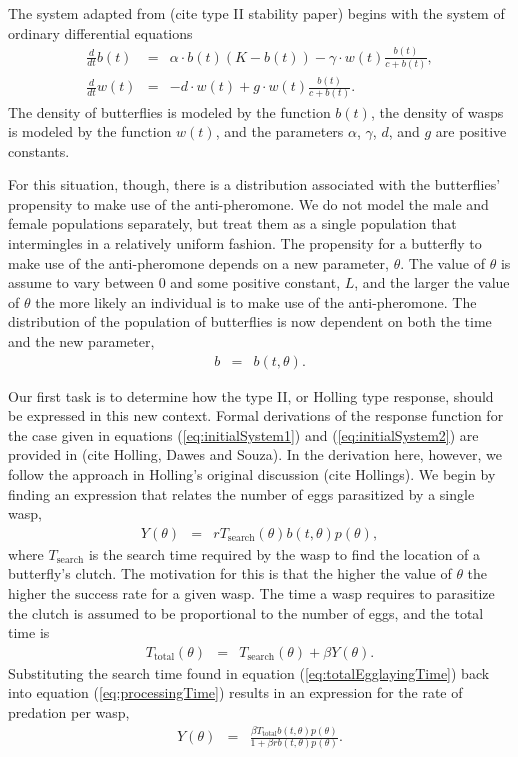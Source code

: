 \documentclass[12pt]{article}
\begin{document}
The system adapted from (cite type II stability paper) begins with the
system of ordinary differential equations
\begin{eqnarray}
  \label{eq:initialSystem1}
  \frac{d}{dt} b(t) & = & \alpha \cdot b(t) (K - b(t)) - \gamma \cdot w(t) \frac{b(t)}{c+b(t)}, \\
  \label{eq:initialSystem2}
  \frac{d}{dt} w(t) & = & -d \cdot w(t) + g \cdot w(t) \frac{b(t)}{c+b(t)}.
\end{eqnarray}
The density of butterflies is modeled by the function $b(t)$, the
density of wasps is modeled by the function $w(t)$, and the parameters
$\alpha$, $\gamma$, $d$, and $g$ are positive constants. 

For this situation, though, there is a distribution associated with
the butterflies' propensity to make use of the anti-pheromone. We do
not model the male and female populations separately, but treat them
as a single population that intermingles in a relatively uniform
fashion. The propensity for a butterfly to make use of the
anti-pheromone depends on a new parameter, $\theta$. The value of
$\theta$ is assume to vary between $0$ and some positive constant,
$L$, and the larger the value of $\theta$ the more likely an
individual is to make use of the anti-pheromone. The distribution of
the population of butterflies is now dependent on both the time and
the new parameter,
\begin{eqnarray}
  b & = & b(t,\theta).
\end{eqnarray}

Our first task is to determine how the type II, or Holling type
response, should be expressed in this new context. Formal derivations
of the response function for the case given in equations
(\ref{eq:initialSystem1}) and (\ref{eq:initialSystem2}) are provided in
(cite Holling, Dawes and Souza). In the derivation here, however,
we follow the approach in Holling's original discussion (cite
Hollings). We begin by finding an expression that relates the number
of eggs parasitized by a single wasp,
\begin{eqnarray}
  \label{eq:processingTime}
  Y(\theta) & = & r T_{\mathrm{search}}(\theta) b(t,\theta) p(\theta),
\end{eqnarray}
where $T_{\mathrm{search}}$ is the search time required by the wasp to
find the location of a butterfly's clutch. The motivation for this is
that the higher the value of $\theta$ the higher the success rate for
a given wasp.  The time a wasp requires to parasitize the clutch is
assumed to be proportional to the number of eggs, and the total time
is
\begin{eqnarray}
  \label{eq:totalEgglayingTime}
  T_{\mathrm{total}}(\theta) & = & T_{\mathrm{search}}(\theta) + \beta Y(\theta).
\end{eqnarray}
Substituting the search time found in equation
(\ref{eq:totalEgglayingTime}) back into equation
(\ref{eq:processingTime}) results in an expression for the rate of
predation per wasp,
\begin{eqnarray}
  \label{eq:waspPredationRate}
  Y(\theta) & = & \frac{\beta T_{\mathrm{total}} b(t,\theta) p(\theta)}{1 + \beta r b(t,\theta) p(\theta)}.
\end{eqnarray}
\end{document}
